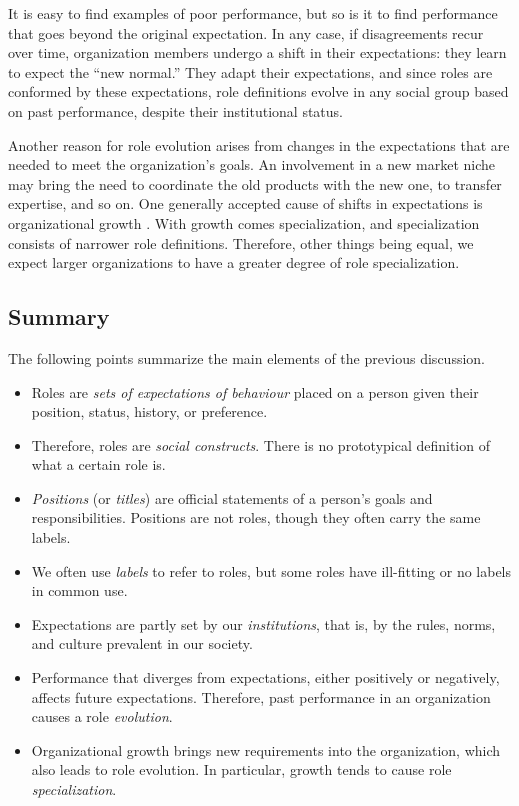\documentclass[10pt, conference, compsocconf]{IEEEtran}
\begin{document}
It is easy to find examples of poor performance, but so is it to find performance that goes beyond the original expectation. In any case, if disagreements recur over time, organization members undergo a shift in their expectations: they learn to expect the ``new normal.'' They adapt their expectations, and since roles are conformed by these expectations, role definitions evolve in any social group based on past performance, despite their institutional status.

Another reason for role evolution arises from changes in the expectations that are needed to meet the organization's goals. An involvement in a new market niche may bring the need to coordinate the old products with the new one, to transfer expertise, and so on. One generally accepted cause of shifts in expectations is organizational growth \cite{Blau1971}. With growth comes specialization, and specialization consists of narrower role definitions. Therefore, other things being equal, we expect larger organizations to have a greater degree of role specialization.


\subsection{Summary}

The following points summarize the main elements of the previous discussion.

\begin{itemize}
\item Roles are \emph{sets of expectations of behaviour} placed on a person given their position, status, history, or preference.

\item Therefore, roles are \emph{social constructs}. There is no prototypical definition of what a certain role is.

\item \emph{Positions} (or \emph{titles}) are official statements of a person's goals and responsibilities. Positions are not roles, though they often carry the same labels.

\item We often use \emph{labels} to refer to roles, but some roles have ill-fitting or no labels in common use.

\item Expectations are partly set by our \emph{institutions}, that is, by the rules, norms, and culture prevalent in our society.

\item Performance that diverges from expectations, either positively or negatively, affects future expectations. Therefore, past performance in an organization causes a role \emph{evolution}.

\item Organizational growth brings new requirements into the organization, which also leads to role evolution. In particular, growth tends to cause role \emph{specialization}.
\end{itemize}
\end{document}
